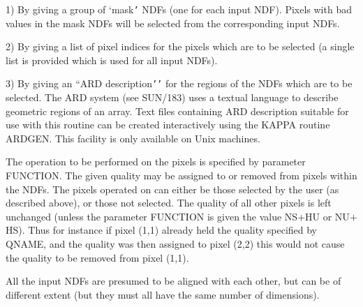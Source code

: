 \documentclass[11pt,nolof,noabs]{starlink}
\begin{document}
\begin{small}
{{      1) By giving a group of `mask\texttt{'} NDFs (one for each input NDF).
      Pixels with bad values in the mask NDFs will be selected from the
      corresponding input NDFs.

      2) By giving a list of pixel indices for the pixels which are to
      be selected (a single list is provided which is used for all input
      NDFs).

      3) By giving an ``ARD description\texttt{'}\texttt{'} for the regions of the NDFs
      which are to be selected. The ARD system (see SUN/183) uses a
      textual language to describe geometric regions of an array. Text
      files containing ARD description suitable for use with this
      routine can be created interactively using the KAPPA routine
      ARDGEN. This facility is only available on Unix machines.

      The operation to be performed on the pixels is specified by
      parameter FUNCTION. The given quality may be assigned to or
      removed from pixels within the NDFs. The pixels operated on
      can either be those selected by the user (as described above),
      or those not selected.  The quality of all other pixels is left
      unchanged (unless the parameter FUNCTION is given the value NS$+$HU
      or NU$+$HS). Thus for instance if pixel (1,1) already held the
      quality specified by QNAME, and the quality was then assigned to
      pixel (2,2) this would not cause the quality to be removed from
      pixel (1,1).

      All the input NDFs are presumed to be aligned with each other, but
      can be of different extent (but they must all have the same number
      of dimensions).
   }
   }
\end{small}
\end{document}

